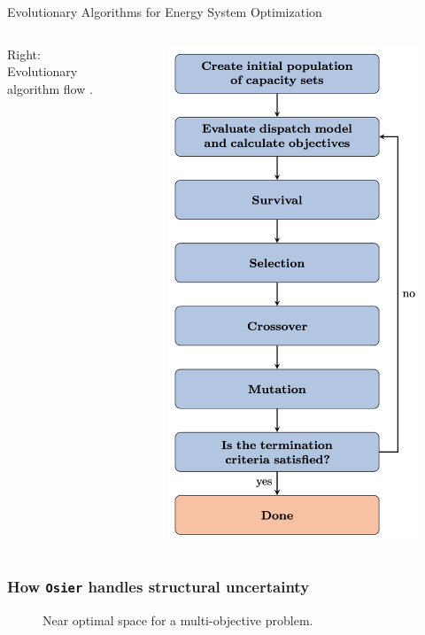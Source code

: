 \begin{frame}
\begin{block}{Evolutionary Algorithms for Energy System Optimization}
\begin{columns}
            Right: Evolutionary algorithm flow \cite{deb_evolutionary_2014}.
            \column[t]{4cm}
            \centering
            \begin{figure}
            \includegraphics[width=0.75\linewidth]{images/ea-flow.png}  
            \end{figure}
        \end{columns}
    \end{block}
\end{frame}

\begin{frame}
    \frametitle{How \texttt{Osier} handles structural uncertainty}

        \begin{figure}
            \centering
            \resizebox{0.75\columnwidth}{!}{}
            \caption{Near optimal space for a multi-objective problem.}
            \label{fig:near-opt}
        \end{figure}
\end{frame}

